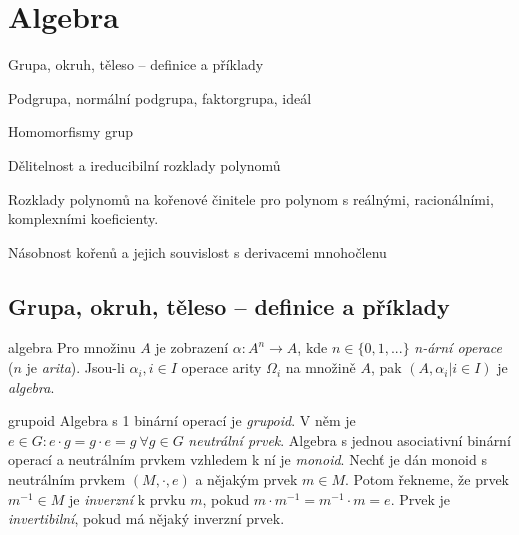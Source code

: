 \def\Real{\mathbb{R}}
\def\Whole{\mathbb{Z}}
\def\Complex{\mathbb{C}}
\def\Rational{\mathbb{Q}}
\def\Nat{\mathbb{N}}
\def\ifandonlyif{\ \Leftrightarrow\ }
\def\implies{\ \Rightarrow\ }
\def\lmod{\mathrm{lmod}}
\def\rmod{\mathrm{rmod}}
\def\ker{\mathrm{ker}}
\def\id{\mathbf{id}}
\def\NSD{\mathbf{NSD}}
\def\deg{\mathrm{deg}\ }
\def\st{\mathrm{st}\ }

\section{Algebra}

\begin{pozadavky}
\begin{pitemize}
    \item Grupa, okruh, těleso -- definice a příklady
    \item Podgrupa, normální podgrupa, faktorgrupa, ideál
    \item Homomorfismy grup 
    \item Dělitelnost a ireducibilní rozklady polynomů 
    \item Rozklady polynomů na kořenové činitele pro polynom s reálnými, racionálními, komplexními koeficienty. 
    \item Násobnost kořenů a jejich souvislost s derivacemi mnohočlenu
\end{pitemize}
\end{pozadavky}


\subsection{Grupa, okruh, těleso -- definice a příklady}

\begin{definiceN}{algebra}
Pro množinu $A$ je zobrazení $\alpha : A^n \to A$, kde $ n \in \{0,1, ...\}$ \emph{n-ární operace} ($n$ je \emph{arita}). Jsou-li $\alpha_i, i \in I$ operace arity $\Omega_i$ na množině $A$, pak $(A, \alpha_i|i\in I )$ je \emph{algebra}.
\end{definiceN}

\begin{definiceN}{grupoid}
Algebra s 1 binární operací je \emph{grupoid}. V něm je $e\in G: e\cdot g = g\cdot e = g\ \forall g\in G$ \emph{neutrální prvek}. Algebra s jednou asociativní binární operací a neutrálním prvkem vzhledem k ní je \emph{monoid}. Nechť je dán monoid s neutrálním prvkem $(M, \cdot,e)$ a nějakým prvek $m\in M$. Potom řekneme, že prvek $m^{-1}\in M$ je \emph{inverzní} k prvku $m$, pokud $m\cdot m^{-1} = m^{-1}\cdot m = e$. Prvek je \emph{invertibilní}, pokud má nějaký inverzní prvek.
\end{definiceN}

